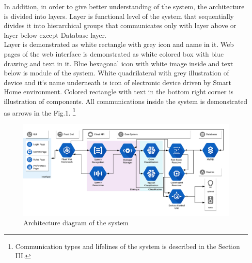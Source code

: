 \documentclass{llncs}
\begin{document}
    In addition, in order to give better understanding of the system, the architecture is divided into layers.
    Layer is functional level of the system that sequentially divides it into hierarchical groups that
    communicates only with layer above or layer below except Database layer.\\
    Layer is demonstrated as white rectangle with grey icon and name in it.
    Web pages of the web interface is demonstrated as white colored box with blue drawing and text in it.
    Blue hexagonal icon with white image inside and text below is module of the system.
    White quadrilateral with grey illustration of device and it`s name underneath is icon of electronic device driven
    by Smart Home environment.
    Colored rectangle with text in the bottom right corner is illustration of components.
    All communications inside the system is demonstrated as arrows in the Fig.1.
    \footnote{Communication types and lifelines of the system is described in the Section III.}
    \begin{figure}
        \includegraphics[width=\textwidth]{arch.png}
        \caption[]{Architecture diagram of the system}
    \end{figure}
\end{document}

